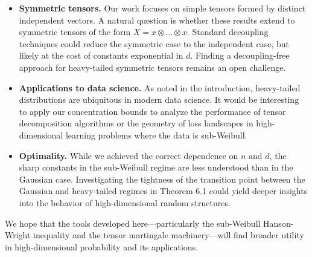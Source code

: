 \documentclass[11pt]{amsart}
\theoremstyle{definition}
\theoremstyle{remark}
\begin{document}
\begin{itemize}
    \item \textbf{Symmetric tensors.} Our work focuses on simple tensors formed by distinct independent vectors. A natural question is whether these results extend to symmetric tensors of the form $X = x \otimes \dots \otimes x$. Standard decoupling techniques could reduce the symmetric case to the independent case, but likely at the cost of constants exponential in $d$. Finding a decoupling-free approach for heavy-tailed symmetric tensors remains an open challenge.
    
    \item \textbf{Applications to data science.} As noted in the introduction, heavy-tailed distributions are ubiquitous in modern data science. It would be interesting to apply our concentration bounds to analyze the performance of tensor decomposition algorithms or the geometry of loss landscapes in high-dimensional learning problems where the data is sub-Weibull.
    
    \item \textbf{Optimality.} While we achieved the correct dependence on $n$ and $d$, the sharp constants in the sub-Weibull regime are less understood than in the Gaussian case. Investigating the tightness of the transition point between the Gaussian and heavy-tailed regimes in Theorem 6.1 could yield deeper insights into the behavior of high-dimensional random structures.
\end{itemize}

We hope that the tools developed here—particularly the sub-Weibull Hanson-Wright inequality and the tensor martingale machinery—will find broader utility in high-dimensional probability and its applications.
\end{document}
